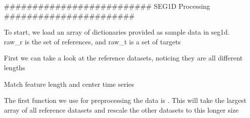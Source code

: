 \documentclass[letterpaper,10pt,english]{sphinxmanual}
\begin{document}
\sphinxAtStartPar
\#\#\#\#\#\#\#\#\#\#\#\#\#\#\#\#\#\#\#\#\#\#\#\#\#\#  SEG1D Processing \#\#\#\#\#\#\#\#\#\#\#\#\#\#\#\#\#\#\#\#\#\#\#

\sphinxAtStartPar
To start, we load an array of dictionaries provided as sample data in seg1d.
raw\_r is the set of references, and raw\_t is a set of targets

\begin{sphinxVerbatim}[commandchars=\\\{\}]
   
\end{sphinxVerbatim}

\sphinxAtStartPar
First we can take a look at the reference datasets, noticing they are all different lengths

\begin{sphinxVerbatim}[commandchars=\\\{\}]
   
       \PYG{p}{[}       \PYG{p}{]}  
      
\end{sphinxVerbatim}

\begin{figure}[htbp]
\centering

\noindent{}
\end{figure}

\sphinxAtStartPar
Match feature length and center time series

\sphinxAtStartPar
The first function we use for pre\sphinxhyphen{}processing the data is . 
This will take the largest array of all reference datasets and rescale the other datasets 
to this longer size
\end{document}
